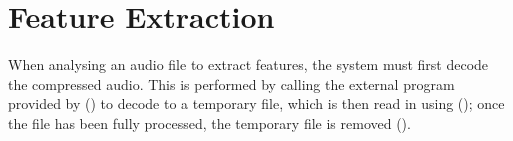 \section{Feature Extraction}
When analysing an audio file to extract features, the system must first decode the compressed audio. This is performed by calling the external  program provided by  () to decode to a temporary file, which is then read in using  (); once the file has been fully processed, the temporary file is removed ().

